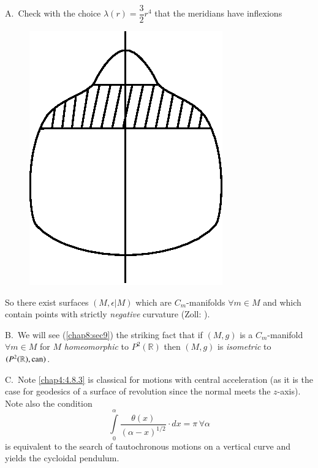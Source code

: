 \begin{remarks*}
A.~Check with the choice $\lambda(r)=\dfrac{3}{2}r^{4}$ that the
meridians have inflexions
\begin{figure}[H]
\centering
\includegraphics{figures/chap4-fig6.eps}
\end{figure}
So there exist surfaces $(M,\epsilon|M)$ which are $C_{m}$-manifolds
$\forall m\in M$ and which contain points with strictly {\em negative}
curvature (Zoll: \cite{30}). 

B.~We will see (\eqref{chap8:sec9}) the striking fact that if $(M,g)$ is a
$C_{m}$-manifold $\forall m\in M$ for $M$ {\em homeomorphic} to
$P^{2}(\mathbb{R})$ then $(M,g)$ is {\em isometric} to
$(P^{2}(\mathbb{R}),\operatorname{can})$.

C.~Note \eqref{chap4:4.8.3} is classical for motions with central
acceleration (as it is the case for geodesics of a surface of
revolution since the normal meets the $z$-axis). Note also the
condition
$$
\int\limits^{\alpha}_{0}\frac{\theta(x)}{(\alpha-x)^{1/2}}\cdot
dx=\pi \, \forall \alpha
$$\pageoriginale
is equivalent to the search of tautochronous motions on a vertical
curve and yields the cycloidal pendulum.
\end{remarks*}


